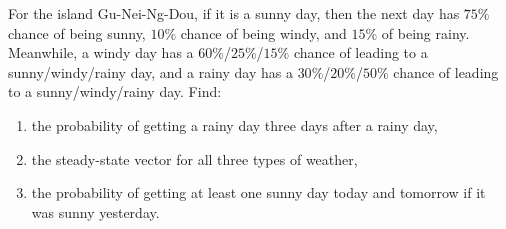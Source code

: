 \begin{Exercise}
For the island Gu-Nei-Ng-Dou, if it is a sunny day, then the next day has $75\%$ chance of being sunny, $10\%$ chance of being windy, and $15\%$ of being rainy. Meanwhile, a windy day has a $60\%$/$25\%$/$15\%$ chance of leading to a sunny/windy/rainy day, and a rainy day has a $30\%$/$20\%$/$50\%$ chance of leading to a sunny/windy/rainy day. Find:
\begin{enumerate}[label=(\alph*)]
\item the probability of getting a rainy day three days after a rainy day,
\item the steady-state vector for all three types of weather,
\item the probability of getting at least one sunny day today and tomorrow if it was sunny yesterday.
\end{enumerate}
\end{Exercise}
